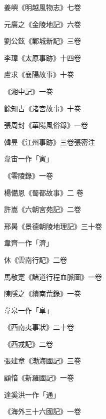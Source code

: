 \begin{pinyinscope}
 姜嶼《明越風物志》七卷



 元廣之《金陵地記》六卷



 劉公鉉《鄴城新記》三卷



 李璋《太原事跡》十四卷



 盧求《襄陽故事》十卷



 《湘中記》一卷



 餘知古《渚宮故事》十卷



 張周封《華陽風俗錄》一卷



 韓昱《江州事跡》三卷張密注



 韋宙一作「寅」



 《零陵錄》一卷



 楊備恩《蜀都故事》二
 卷



 許嵩《六朝宮苑記》二卷



 邢昺《景德朝陵地理記》三十卷



 韋齊一作「濟」



 休《雲南行記》二卷



 馬敬寔《諸道行程血脈圖》一卷



 陳隱之《續南荒錄》一卷



 韋皋一作「阜」



 《西南夷事狀》二十卷



 《西戎記》二卷



 張建章《渤海國記》三卷



 顧愔《新羅國記》一卷



 達奚洪一作「通」



 《海外三十六國記》一卷




\end{pinyinscope}
